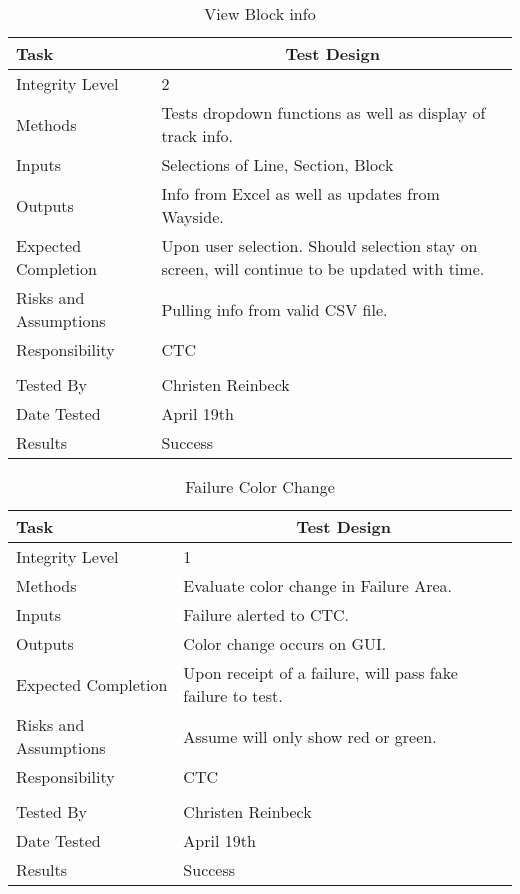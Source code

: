 \documentclass[]{article}
\begin{document}
\begin{table}[H]
	\centering
	\caption{View Block info}
	\begin{tabular}{|l|l|}
		\hline
		Task & \multicolumn{1}{c|}{Test Design} \\ \hline
		Integrity Level & 2 \\ \hline
		Methods & Tests dropdown functions as well as display of track info.\\ \hline
		Inputs &  Selections of Line, Section, Block \\ \hline
		Outputs &  Info from Excel as well as updates from Wayside.\\ \hline
		Expected Completion & \parbox[t]{10cm}{Upon user selection. Should selection stay on screen, will continue to be updated with time.}\\ \hline
		Risks and Assumptions & \parbox[t]{10cm}{Pulling info from valid CSV file.} \\ \hline
		Responsibility & CTC\\ \hline
		\\ \hline
		Tested By   &  Christen Reinbeck\\	\hline
		Date Tested & \parbox[t]{10cm}{April 19th}\\ \hline
		Results & Success\\ \hline
	\end{tabular}
\end{table}

\begin{table}[H]
	\centering
	\caption{Failure Color Change}
	\begin{tabular}{|l|l|}
		\hline
		Task & \multicolumn{1}{c|}{Test Design} \\ \hline
		Integrity Level & 1 \\ \hline
		Methods & Evaluate color change in Failure Area.\\ \hline
		Inputs &  Failure alerted to CTC. \\ \hline
		Outputs &  Color change occurs on GUI. \\ \hline
		Expected Completion & \parbox[t]{10cm}{Upon receipt of a failure, will pass fake failure to test.}\\ \hline
		Risks and Assumptions & \parbox[t]{10cm}{Assume will only show red or green.} \\ \hline
		Responsibility & CTC\\ \hline
		\\ \hline
		Tested By   &  Christen Reinbeck\\	\hline
		Date Tested & \parbox[t]{10cm}{April 19th}\\ \hline
		Results & Success\\ \hline
	\end{tabular}
\end{table}
\end{document}

